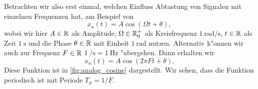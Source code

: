Betrachten wir also erst einmal, welchen Einfluss Abtastung von Signalen mit einzelnen Frequenzen hat, am Beispiel von
%
\begin{equation}\label{eq:analog_cosine}
    x_a(t) = A \cos(\Omega t + \theta),
\end{equation}
%
wobei wir hier $A \in \mathbb{R}$ als Amplitude, $\Omega \in \mathbb{R}^+_0$ als Kreisfrequenz $\SI{1}{\radian\per\second}$, $t \in \mathbb{R}$ als Zeit $\SI{1}{\second}$ und die Phase $\theta \in \mathbb{R}$ mit Einheit $\SI{1}{\radian}$ nutzen.
Alternativ k"onnen wir auch zur Frequenz $F \in \mathbb{R}$ $\SI{1}{\per\second} = \SI{1}{\hertz}$ "ubergehen.
Dann erhalten wir
\[
x_a(t) = A \cos(2 \pi F t + \theta).
\]
Diese Funktion ist in \cref{fig:analog_cosine} dargestellt.
Wir sehen, dass die Funktion periodisch ist mit Periode $T_p = 1/F$.


